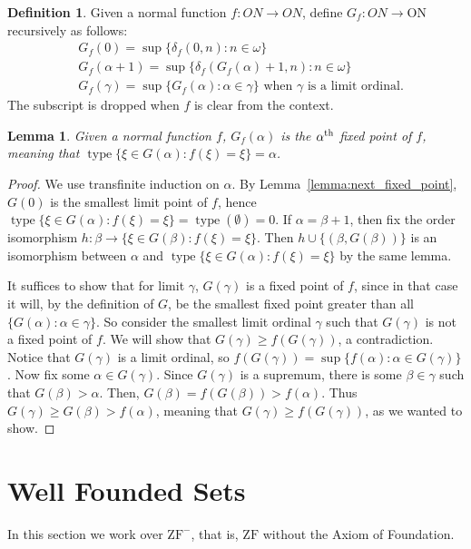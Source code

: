 \documentclass{report}
\newtheorem{lemma}{Lemma}[section]
\theoremstyle{definition}
\newtheorem{definition}{Definition}[section]
\theoremstyle{remark}
\newcommand{\set}[1]{\{#1\}}
\DeclareMathOperator{\type}{type}
\begin{document}
\begin{definition}
    Given a normal function $f : ON \to ON$, define $G_f : ON \to \mathrm{ON}$ recursively as follows:
    \begin{align*}
        &G_f(0) = \sup\set{\delta_f(0, n) : n \in \omega} \\
        &G_f(\alpha + 1) = \sup\set{\delta_f(G_f(\alpha)+1, n) : n \in \omega} \\
        &G_f(\gamma) = \sup\set{G_f(\alpha) : \alpha \in \gamma} \text{ when $\gamma$ is a limit ordinal.}
    \end{align*} The subscript is dropped when $f$ is clear from the context.
\end{definition}

\begin{lemma} \label{lemma:fixed_of_G}
    Given a normal function $f$, $G_f(\alpha)$ is the $\alpha\textsuperscript{th}$ fixed point of $f$, meaning that $\type\set{\xi \in G(\alpha) : f(\xi) = \xi} = \alpha$.
\end{lemma} 

\begin{proof}
    We use transfinite induction on $\alpha$. By Lemma~\ref{lemma:next_fixed_point}, $G(0)$ is the smallest limit point of $f$, hence $\type\set{\xi \in G(\alpha) : f(\xi) = \xi} = \type(\emptyset) = 0$. If $\alpha = \beta + 1$, then fix the order isomorphism $h : \beta \to \set{\xi \in G(\beta) : f(\xi) = \xi}$. Then $h \cup \set{(\beta, G(\beta))}$ is an isomorphism between $\alpha$ and $\type\set{\xi \in G(\alpha) : f(\xi) = \xi}$ by the same lemma.
    
    It suffices to show that for limit $\gamma$, $G(\gamma)$ is a fixed point of $f$, since in that case it will, by the definition of $G$, be the smallest fixed point greater than all $\set{G(\alpha) : \alpha \in \gamma}$. So consider the smallest limit ordinal $\gamma$ such that $G(\gamma)$ is not a fixed point of $f$. We will show that $G(\gamma) \geq f(G(\gamma))$, a contradiction. Notice that $G(\gamma)$ is a limit ordinal, so $f(G(\gamma)) = \sup\set{f(\alpha) : \alpha \in G(\gamma)}$. Now fix some $\alpha \in G(\gamma)$. Since $G(\gamma)$ is a supremum, there is some $\beta \in \gamma$ such that $G(\beta) > \alpha$. Then, $G(\beta) = f(G(\beta)) > f(\alpha)$. Thus $G(\gamma) \geq G(\beta) > f(\alpha)$, meaning that $G(\gamma) \geq f(G(\gamma))$, as we wanted to show.
\end{proof}

\section{Well Founded Sets}
    In this section we work over $\mathrm{ZF^-}$, that is, $\mathrm{ZF}$ without the Axiom of Foundation.
    
\end{document}
